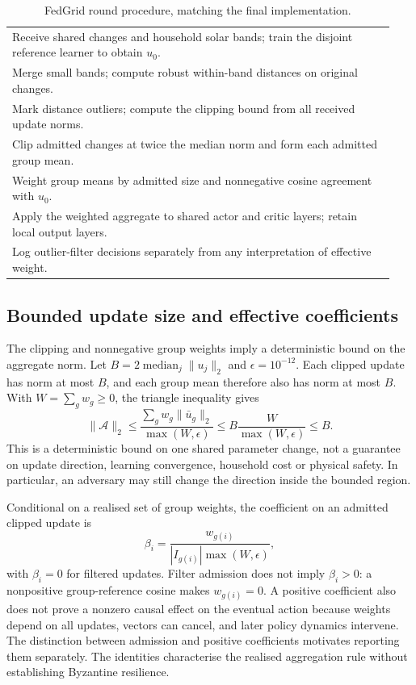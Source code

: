 \begin{table}[htbp]
\centering
\caption{FedGrid round procedure, matching the final implementation.}
\label{tab:algorithm}
\begin{tabular}{p{0.94\linewidth}}
\toprule
Receive shared changes and household solar bands; train the disjoint reference learner to obtain $u_0$.\\
Merge small bands; compute robust within-band distances on original changes.\\
Mark distance outliers; compute the clipping bound from all received update norms.\\
Clip admitted changes at twice the median norm and form each admitted group mean.\\
Weight group means by admitted size and nonnegative cosine agreement with $u_0$.\\
Apply the weighted aggregate to shared actor and critic layers; retain local output layers.\\
Log outlier-filter decisions separately from any interpretation of effective weight.\\
\bottomrule
\end{tabular}
\end{table}

\subsection{Bounded update size and effective coefficients}
The clipping and nonnegative group weights imply a deterministic bound on the aggregate norm. Let $B=2\operatorname{median}_j\|u_j\|_2$ and $\epsilon=10^{-12}$. Each clipped update has norm at most $B$, and each group mean therefore also has norm at most $B$. With $W=\sum_gw_g\geq0$, the triangle inequality gives
\begin{equation}
\|\mathcal A\|_2\leq\frac{\sum_gw_g\|\bar u_g\|_2}{\max(W,\epsilon)}
\leq B\frac{W}{\max(W,\epsilon)}\leq B.
\end{equation}
This is a deterministic bound on one shared parameter change, not a guarantee on update direction, learning convergence, household cost or physical safety. In particular, an adversary may still change the direction inside the bounded region.

Conditional on a realised set of group weights, the coefficient on an admitted clipped update is
\begin{equation}
\beta_i=\frac{w_{g(i)}}{|I_{g(i)}|\max(W,\epsilon)},
\end{equation}
with $\beta_i=0$ for filtered updates. Filter admission does not imply $\beta_i>0$: a nonpositive group-reference cosine makes $w_{g(i)}=0$. A positive coefficient also does not prove a nonzero causal effect on the eventual action because weights depend on all updates, vectors can cancel, and later policy dynamics intervene. The distinction between admission and positive coefficients motivates reporting them separately. The identities characterise the realised aggregation rule without establishing Byzantine resilience.

